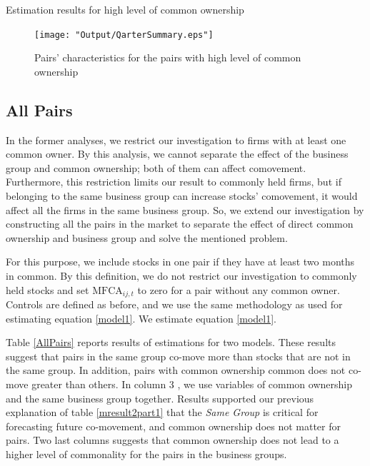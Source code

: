 			{\begin{table}[htbp]
					\centering
					\caption{\scriptsize Estimation results for high level of common ownership}
					\label{QTimemresult2subsample}
					{
						\resizebox{\textwidth}{!}{
						
						}
					}
			\end{table}}
			
			\begin{figure}[htbp]
				\centering  
				\texttt{[image: "Output/QarterSummary.eps"]}
				\caption{Pairs' characteristics for the pairs with high level of common ownership}
				\label{QarterSummary}
			\end{figure}
			

				
				
				\FloatBarrier
				
				\subsection{All Pairs}
				
	In the former analyses, we restrict our investigation to firms with at least one common owner. By this analysis, we cannot separate the effect of the business group and common ownership; both of them can affect comovement. Furthermore, this restriction limits our result to commonly held firms, but if belonging to the same business group can increase stocks' comovement, it would affect all the firms in the same business group. 
	So, we extend our investigation by constructing all the pairs in the market to separate the effect of direct common ownership and business group and solve the mentioned problem. 
	
	For this purpose, we include stocks in one pair if they have at least two months in common. By this definition, we do not restrict our investigation to commonly held stocks and set $\text{MFCA}_{ij,t}$ to zero for a pair without any common owner. Controls are defined as before, and we use the same methodology as used for estimating equation \ref{model1}. We estimate equation \ref{model1}. 
	
	Table \ref{AllPairs} reports results of estimations for two models. These results suggest that pairs in the same group co-move more than stocks that are not in the same group. In addition, pairs with common ownership common does not co-move greater than others. In column 3 , we use variables of common ownership and the same business group together. Results supported our previous explanation of table \ref{mresult2part1} that the \textit{Same Group} is critical for forecasting future co-movement, and common ownership does not matter for pairs. Two last columns suggests that common ownership does not lead to a higher level of commonality for the pairs in the business groups.
					
